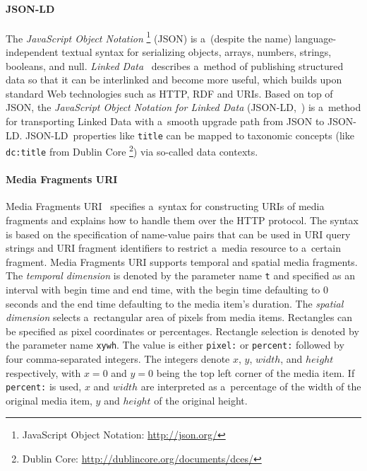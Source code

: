 \documentclass{sig-alternate}
\newcommand{\inlinelistingsize}{\fontsize{8pt}{11pt}}
\let\oldurl\url
\renewcommand{\url}[1]{\inlinelistingsize\oldurl{#1}}
\def\JSONLD{\mbox{JSON-LD}}
\begin{document}
\paragraph{\JSONLD}

The \emph{JavaScript Object Notation}%
\footnote{JavaScript Object Notation: \url{http://json.org/}}
(JSON)
is a~(despite the name) language-independent textual syntax
for serializing objects, arrays, numbers, strings, booleans, and null.
\emph{Linked Data}~\cite{bizer2009linkeddata}
describes a~method of publishing structured data
so that it can be interlinked and become more useful,
which builds upon standard Web technologies such as HTTP, RDF and URIs.
Based on top of JSON, the
\emph{JavaScript Object Notation for Linked Data}
(\JSONLD,~\cite{sporny2013jsonld}) is a~method for transporting
Linked Data with a~smooth upgrade path from JSON to \JSONLD.
\JSONLD\ properties like \texttt{title} can be mapped to taxonomic
concepts (like \texttt{dc:title} from Dublin Core%
\footnote{Dublin Core: \url{http://dublincore.org/documents/dces/}})
via so-called data contexts.\vfill

\paragraph{Media Fragments URI}

Media Fragments URI~\cite{troncy2012mediafragments}
specifies a~syntax for constructing URIs of media fragments
and explains how to handle them over the HTTP protocol.
The syntax is based on the specification of
name-value pairs that can be used in URI query strings
and URI fragment identifiers to restrict a~media resource
to a~certain fragment.
Media Fragments URI supports temporal and spatial media fragments.
The \emph{temporal dimension} is denoted
by the parameter name \texttt{t} and specified
as an interval with begin time and end time,
with the begin time defaulting to 0 seconds
and the end time defaulting to the media item's duration.
The \emph{spatial dimension} selects
a~rectangular area of pixels from media items.
Rectangles can be specified as pixel coordinates or percentages.
Rectangle selection is denoted by the parameter name \texttt{xywh}.
The value is either \texttt{pixel:} or \texttt{percent:}
followed by four comma-separated integers.
The integers denote $x$, $y$, $width$, and $height$ respectively,
with $x = 0$ and $y = 0$ being the top left corner of the media item.
If \texttt{percent:} is used, $x$ and $width$ are interpreted
as a~percentage of the width of the original media item,
$y$ and $height$
of the original height.
\end{document}
